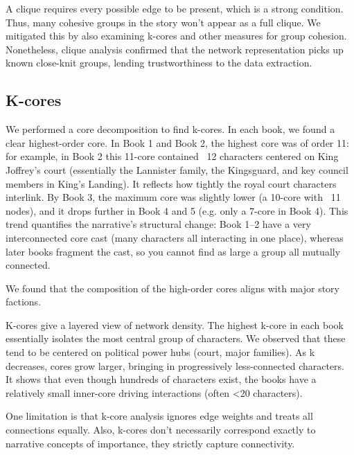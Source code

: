 \documentclass[12pt, a4paper]{article}
\begin{document}
A clique requires every possible edge to be present, which is a strong condition. Thus, many cohesive groups in the story won't appear as a full clique. We mitigated this by also examining k-cores and other measures for group cohesion. Nonetheless, clique analysis confirmed that the network representation picks up known close-knit groups, lending trustworthiness to the data extraction.

\subsection*{K-cores}

We performed a core decomposition to find k-cores. In each book, we found a clear highest-order core. In Book 1 and Book 2, the highest core was of order 11: for example, in Book 2 this 11-core contained ~12 characters centered on King Joffrey's court (essentially the Lannister family, the Kingsguard, and key council members in King's Landing). It reflects how tightly the royal court characters interlink. By Book 3, the maximum core was slightly lower (a 10-core with ~11 nodes), and it drops further in Book 4 and 5 (e.g. only a 7-core in Book 4). This trend quantifies the narrative's structural change: Book 1–2 have a very interconnected core cast (many characters all interacting in one place), whereas later books fragment the cast, so you cannot find as large a group all mutually connected. 

We found that the composition of the high-order cores aligns with major story factions.

K-cores give a layered view of network density. The highest k-core in each book essentially isolates the most central group of characters. We observed that these tend to be centered on political power hubs (court, major families). As k decreases, cores grow larger, bringing in progressively less-connected characters. It shows that even though hundreds of characters exist, the books have a relatively small inner-core driving interactions (often <20 characters).

One limitation is that k-core analysis ignores edge weights and treats all connections equally. Also, k-cores don't necessarily correspond exactly to narrative concepts of importance, they strictly capture connectivity. 
\end{document}
